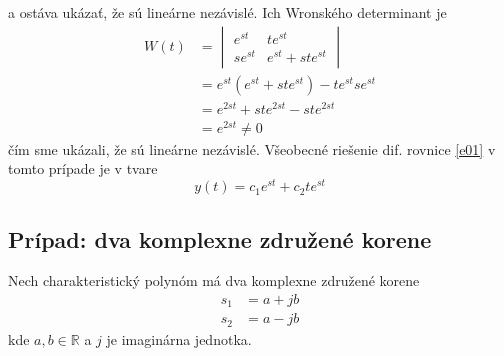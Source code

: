 \documentclass[a4paper, 10pt, ]{article}
\begin{document}
a ostáva ukázať, že sú lineárne nezávislé. Ich Wronského determinant je
\begin{equation}
    \begin{aligned}
        W(t) &= \begin{vmatrix}
            e^{st} & t e^{st} \\
            s e^{st} & e^{st} + s t e^{st}
        \end{vmatrix} \\
        &= e^{st} \left( e^{st} + s t e^{st} \right) - t e^{st} s e^{st} \\
        &= e^{2st} + st e^{2st} - st  e^{2st} \\
        &= e^{2st} \neq 0
    \end{aligned}
\end{equation}
čím sme ukázali, že sú lineárne nezávislé. Všeobecné riešenie dif. rovnice \eqref{e01} v tomto prípade je v tvare
\begin{equation}
    y(t) = c_1 e^{st} + c_2 t e^{st}
\end{equation}





\subsection{Prípad: dva komplexne združené korene}

Nech charakteristický polynóm má dva komplexne združené korene
\begin{subequations}
    \begin{align}
        s_1 &= a + j b \\
        s_2 &= a - j b
    \end{align}
\end{subequations}
kde $a, b \in \mathbb R$ a $j$ je imaginárna jednotka.
\end{document}
